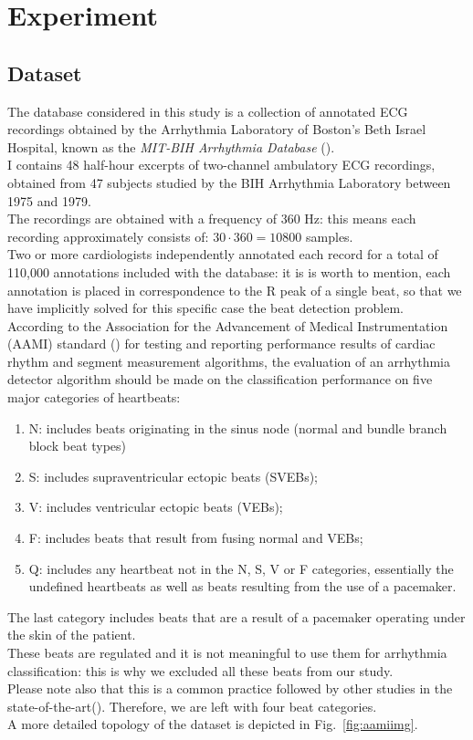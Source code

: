\documentclass[LaM,binding=0.6cm]{sapthesis}
\begin{document}
\chapter{Experiment}

\section{Dataset}
The database considered in this study is a collection of annotated ECG recordings obtained by the Arrhythmia Laboratory of Boston's Beth Israel Hospital, known as the \textit{MIT-BIH Arrhythmia Database} (\cite{dbmitbih}).\\I contains 48 half-hour excerpts of two-channel ambulatory ECG recordings, obtained from 47 subjects studied by the BIH Arrhythmia Laboratory between 1975 and 1979.\\The recordings are obtained with a frequency of 360 Hz: this means each recording approximately consists of: $30\cdot360=10800$ samples.\\Two or more cardiologists independently annotated each record for a total of 110,000 annotations included with the database: it is is worth to mention, each annotation is placed in correspondence to the R peak of a single beat, so that we have implicitly solved for this specific case the beat detection problem.\\According to the Association for the Advancement of Medical Instrumentation (AAMI) standard (\cite{aamistd}) for testing and reporting performance results of cardiac rhythm and segment measurement algorithms, the evaluation of an arrhythmia detector algorithm should be made on the classification performance on five major categories of heartbeats:
\begin{enumerate}
\item N: includes beats originating in the sinus node (normal and bundle branch block beat types)
\item S: includes supraventricular ectopic beats (SVEBs);
\item V: includes ventricular ectopic beats (VEBs);
\item F: includes beats that result from fusing normal and VEBs;
\item Q: includes any heartbeat not in the N, S, V or F categories, essentially the undefined heartbeats as well as beats resulting from the use of a pacemaker.
\end{enumerate}
The last category includes beats that are a result of a pacemaker operating under the skin of the patient.\\These beats are regulated and it is not meaningful to use them for arrhythmia classification: this is why  we excluded all these beats from our study.\\Please note also that this is a common practice followed by other studies in the state-of-the-art(\cite{fog}). Therefore, we are left with four beat categories.\\A more detailed topology of the dataset is depicted in Fig.~\ref{fig:aamiimg}.
\end{document}
